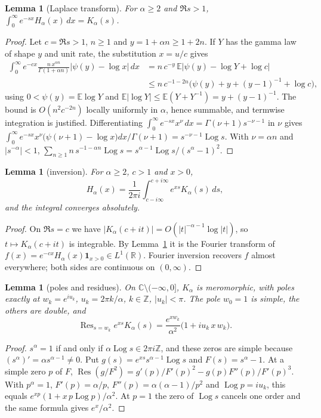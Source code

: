 \documentclass[11pt,a4paper]{article}
\theoremstyle{plain}
\newtheorem{lemma}[theorem]{Lemma}
\theoremstyle{remark}
\newcommand{\E}{\mathbb E}
\newcommand{\R}{\mathbb R}
\newcommand{\Z}{\mathbb Z}
\newcommand{\C}{\mathbb C}
\DeclareMathOperator{\Log}{Log}
\DeclareMathOperator{\Res}{Res}
\begin{document}
\begin{lemma}[Laplace transform]\label{lem:laplace}
For $\alpha\ge2$ and $\Re s>1$, $\displaystyle\int_0^\infty e^{-sx}H_\alpha(x)\,dx=K_\alpha(s)$.
\end{lemma}
\begin{proof}
Let $c=\Re s>1$, $n\ge1$ and $y=1+\alpha n\ge1+2n$. If $Y$ has the gamma law of shape $y$ and unit
rate, the substitution $x=u/c$ gives
\begin{align*}
 \int_0^\infty e^{-cx}\frac{n\,x^{\alpha n}}{\Gamma(1+\alpha n)}\bigl|\psi(y)-\log x\bigr|\,dx
 &=n\,c^{-y}\,\E\bigl|\psi(y)-\log Y+\log c\bigr|\\
 &\le n\,c^{-1-2n}\bigl(\psi(y)+y+(y-1)^{-1}+\log c\bigr),
\end{align*}
using $0<\psi(y)=\E\log Y$ and $\E|\log Y|\le\E(Y+Y^{-1})=y+(y-1)^{-1}$. The bound is
$O(n^2c^{-2n})$ locally uniformly in $\alpha$, hence summable, and termwise integration is
justified. Differentiating $\int_0^\infty e^{-sx}x^\nu\,dx=\Gamma(\nu+1)s^{-\nu-1}$ in $\nu$ gives
$\int_0^\infty e^{-sx}x^\nu\bigl(\psi(\nu+1)-\log x\bigr)dx/\Gamma(\nu+1)=s^{-\nu-1}\Log s$.
With $\nu=\alpha n$ and $|s^{-\alpha}|<1$,
$\sum_{n\ge1}n\,s^{-1-\alpha n}\Log s=s^{\alpha-1}\Log s/(s^\alpha-1)^2$.
\end{proof}

\begin{lemma}[inversion]\label{lem:inversion}
For $\alpha\ge2$, $c>1$ and $x>0$,
\[
 H_\alpha(x)=\frac{1}{2\pi i}\int_{c-i\infty}^{c+i\infty}e^{xs}K_\alpha(s)\,ds,
\]
and the integral converges absolutely.
\end{lemma}
\begin{proof}
On $\Re s=c$ we have $|K_\alpha(c+it)|=O(|t|^{-\alpha-1}\log|t|)$, so $t\mapsto K_\alpha(c+it)$ is
integrable. By Lemma~\ref{lem:laplace} it is the Fourier transform of
$f(x)=e^{-cx}H_\alpha(x)\mathbf 1_{x>0}\in L^1(\R)$. Fourier inversion recovers $f$ almost
everywhere; both sides are continuous on $(0,\infty)$.
\end{proof}

\begin{lemma}[poles and residues]\label{lem:poles}
On $\C\setminus(-\infty,0]$, $K_\alpha$ is meromorphic, with poles exactly at $w_k=e^{iu_k}$,
$u_k=2\pi k/\alpha$, $k\in\Z$, $|u_k|<\pi$. The pole $w_0=1$ is simple, the others are double, and
\[
 \Res_{s=w_k}e^{xs}K_\alpha(s)=\frac{e^{xw_k}}{\alpha^2}\bigl(1+iu_k\,x\,w_k\bigr).
\]
\end{lemma}
\begin{proof}
$s^\alpha=1$ if and only if $\alpha\Log s\in2\pi i\Z$, and these zeros are simple because
$(s^\alpha)'=\alpha s^{\alpha-1}\ne0$. Put $g(s)=e^{xs}s^{\alpha-1}\Log s$ and $F(s)=s^\alpha-1$.
At a simple zero $p$ of $F$, $\Res(g/F^2)=g'(p)/F'(p)^2-g(p)F''(p)/F'(p)^3$. With $p^\alpha=1$,
$F'(p)=\alpha/p$, $F''(p)=\alpha(\alpha-1)/p^2$ and $\Log p=iu_k$, this equals
$e^{xp}(1+x\,p\Log p)/\alpha^2$. At $p=1$ the zero of $\Log s$ cancels one order and the same
formula gives $e^x/\alpha^2$.
\end{proof}
\end{document}

